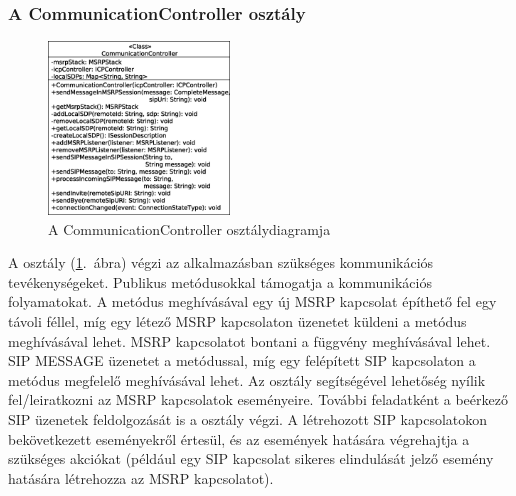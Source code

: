 \subsubsection*{A CommunicationController osztály}
\label{sec:client_communication_controller}

\begin{figure}
  \vspace{-68pt}
  \begin{center}
    \includegraphics[width=0.43\textwidth]{img/class_diagrams/client/eps/CommunicationController.eps}
  \end{center}
  \vspace{-15pt}
  \captionsetup{font=scriptsize}
  \caption{A CommunicationController osztálydiagramja}
   \label{fig:class_client_communication_controller}
  \vspace{-18pt}
\end{figure}

A  osztály (\ref{fig:class_client_communication_controller}.~ábra) végzi az alkalmazásban szükséges kommunikációs tevékenységeket. Publikus metódusokkal támogatja a kommunikációs folyamatokat. A  metódus meghívásával egy új MSRP kapcsolat építhető fel egy távoli féllel, míg egy létező MSRP kapcsolaton üzenetet küldeni a  metódus meghívásával lehet. MSRP kapcsolatot bontani a  függvény meghívásával lehet. SIP MESSAGE üzenetet a  metódussal, míg egy felépített SIP kapcsolaton a  metódus megfelelő meghívásával lehet. Az osztály segítségével lehetőség nyílik fel/leiratkozni az MSRP kapcsolatok eseményeire. További feladatként a beérkező SIP üzenetek feldolgozását is a  osztály végzi. A létrehozott SIP kapcsolatokon bekövetkezett eseményekről értesül, és az események hatására végrehajtja a szükséges akciókat (például egy SIP kapcsolat sikeres elindulását jelző esemény hatására létrehozza az MSRP kapcsolatot).

